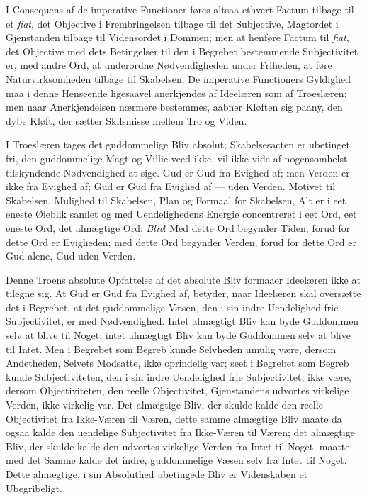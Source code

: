 \documentclass[12pt]{book}
\newcommand{\opage}[1]{\marginnote{\footnotesize\textit{[#1]}}}
\begin{document}
I Consequens af de imperative Functioner føres altsaa
ethvert Factum tilbage til et \textit{fiat}, det Objective i Frembringelsen
tilbage til det Subjective, Magtordet i Gjenstanden tilbage til
Vidensordet i Dommen; men at henføre Factum til \textit{fiat}, det
Objective med dets Betingelser til den i Begrebet bestemmende
Subjectivitet er, med andre Ord, at underordne Nødvendigheden
under Friheden, at føre Naturvirksomheden tilbage til
Skabelsen. De imperative Functioners Gyldighed maa i
denne Henseende ligesaavel anerkjendes af Ideelæren som af
Troeslæren; men naar Anerkjendelsen nærmere bestemmes,
aabner Kløften sig paany, den dybe Kløft, der sætter Skilsmisse
mellem Tro og Viden.

I Troeslæren tages det guddommelige Bliv absolut;
Skabelsesacten er ubetinget fri, den guddommelige Magt og
Villie veed ikke, vil ikke vide af nogensomhelst tilskyndende
Nødvendighed at sige. Gud er Gud fra Evighed af; men
Verden er ikke fra Evighed af; Gud er Gud fra Evighed af
--- uden Verden. Motivet til Skabelsen, Mulighed til Skabelsen,
Plan og Formaal for Skabelsen, Alt er i eet eneste
Øieblik samlet og med Uendelighedens Energie concentreret i
eet Ord, eet eneste Ord, det almægtige Ord: \emph{Bliv}! Med
dette Ord begynder Tiden, forud for dette Ord er Evigheden;
med dette Ord begynder Verden, forud for dette Ord er Gud
alene, Gud uden Verden.

Denne Troens absolute Opfattelse af det absolute Bliv
formaaer Ideelæren ikke at tilegne sig. At Gud er Gud fra
Evighed af, betyder, naar Ideelæren skal oversætte det i Begrebet,
at det guddommelige Væsen, den i sin indre Uendelighed
frie Subjectivitet, er med Nødvendighed. Intet almægtigt
Bliv kan byde Guddommen selv at blive til Noget;
\opage{155}intet almægtigt Bliv kan byde Guddommen selv at blive til
Intet. Men i Begrebet som Begreb kunde Selvheden umulig
være, dersom Andetheden, Selvets Modsatte, ikke oprindelig
var; seet i Begrebet som Begreb kunde Subjectiviteten, den
i sin indre Uendelighed frie Subjectivitet, ikke være, dersom
Objectiviteten, den reelle Objectivitet, Gjenstandens udvortes
virkelige Verden, ikke virkelig var. Det almægtige Bliv, der
skulde kalde den reelle Objectivitet fra Ikke-Væren til Væren,
dette samme almægtige Bliv maate da ogsaa kalde den uendelige %
Subjectivitet fra Ikke-Væren til Væren; det almægtige
Bliv, der skulde kalde den udvortes virkelige Verden fra Intet
til Noget, maatte med det Samme kalde det indre, guddommelige
Væsen selv fra Intet til Noget. Dette almægtige, i sin
Absoluthed ubetingede Bliv er Videnskaben et Ubegribeligt.
\end{document}
